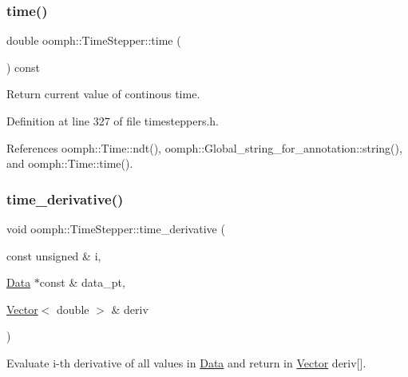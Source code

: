 \subsubsection{\texorpdfstring{time()}{time()}\hspace{0.1cm}{\footnotesize\ttfamily [2/2]}}
{\footnotesize\ttfamily double oomph\+::\+Time\+Stepper\+::time (\begin{DoxyParamCaption}{ }\end{DoxyParamCaption}) const\hspace{0.3cm}{\ttfamily [inline]}}



Return current value of continous time. 



Definition at line 327 of file timesteppers.\+h.



References oomph\+::\+Time\+::ndt(), oomph\+::\+Global\+\_\+string\+\_\+for\+\_\+annotation\+::string(), and oomph\+::\+Time\+::time().

\mbox{\label{classoomph_1_1TimeStepper_a802c8b2a2e1933e4e8da30c6d10d1f9c}} 
\subsubsection{\texorpdfstring{time\+\_\+derivative()}{time\_derivative()}\hspace{0.1cm}{\footnotesize\ttfamily [1/4]}}
{\footnotesize\ttfamily void oomph\+::\+Time\+Stepper\+::time\+\_\+derivative (\begin{DoxyParamCaption}\item[{const unsigned \&}]{i,  }\item[{\hyperlink{classoomph_1_1Data}{Data} $\ast$const \&}]{data\+\_\+pt,  }\item[{\hyperlink{classoomph_1_1Vector}{Vector}$<$ double $>$ \&}]{deriv }\end{DoxyParamCaption})\hspace{0.3cm}{\ttfamily [inline]}}



Evaluate i-\/th derivative of all values in \hyperlink{classoomph_1_1Data}{Data} and return in \hyperlink{classoomph_1_1Vector}{Vector} deriv\mbox{[}\mbox{]}. 



